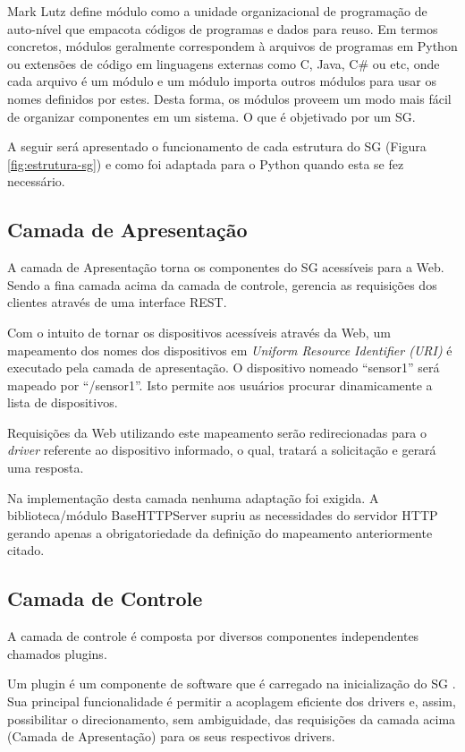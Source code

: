 \documentclass[12pt,a4paper,oneside]{report}
\begin{document}
Mark Lutz \cite{python} define módulo como a unidade organizacional de programação de auto-nível que empacota códigos de programas e dados para reuso. Em termos concretos, módulos geralmente correspondem à arquivos de programas em Python ou extensões de código em linguagens externas como C, Java, C\# ou etc, onde cada arquivo é um módulo e um módulo importa outros módulos para usar os nomes definidos por estes. Desta forma, os módulos proveem um modo mais fácil de organizar componentes em um sistema. O que é objetivado por um SG.

A seguir será apresentado o funcionamento de cada estrutura do SG (Figura \ref{fig:estrutura-sg}) e como foi adaptada para o Python quando esta se fez necessário.

\subsection{Camada de Apresentação}

A camada de Apresentação torna os componentes do SG acessíveis para a Web. Sendo a fina camada acima da camada de controle, gerencia as requisições dos clientes através de uma interface REST.

Com o intuito de tornar os dispositivos acessíveis através da Web, um mapeamento dos nomes dos dispositivos em \emph{Uniform Resource Identifier (URI)} \cite{w3curi} é executado pela camada de apresentação. O dispositivo nomeado ``sensor1'' será mapeado por ``/sensor1''. Isto permite aos usuários procurar dinamicamente a lista de dispositivos.

Requisições da Web utilizando este mapeamento serão redirecionadas para o \emph{driver} referente ao dispositivo informado, o qual, tratará a solicitação e gerará uma resposta.

Na implementação desta camada nenhuma adaptação foi exigida. A biblioteca/módulo BaseHTTPServer supriu as necessidades do servidor HTTP gerando apenas a obrigatoriedade da definição do mapeamento anteriormente citado.

\subsection{Camada de Controle}

A camada de controle é composta por diversos componentes independentes chamados plugins.

Um plugin é um componente de software que é carregado na inicialização do SG . Sua principal funcionalidade é permitir a acoplagem eficiente dos drivers e, assim, possibilitar o direcionamento, sem ambiguidade, das requisições da camada acima (Camada de Apresentação) para os seus respectivos drivers.
\end{document}
